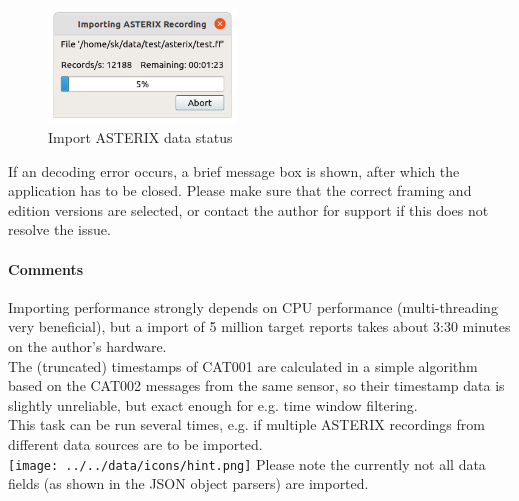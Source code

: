 \begin{figure}[H]
  \center
    \includegraphics[width=5cm]{figures/asterix_import_data_status.png}
  \caption{Import ASTERIX data status}
\end{figure}

If an decoding error occurs, a brief message box is shown, after which the application has to be closed. Please make sure that the correct framing and edition versions are selected, or contact the author for support if this does not resolve the issue. \\


\paragraph{Comments}
Importing performance strongly depends on CPU performance (multi-threading very beneficial), but a import of 5 million target reports takes about 3:30 minutes on the author's hardware. \\

The (truncated) timestamps of CAT001 are calculated in a simple algorithm based on the CAT002 messages from the same sensor, so their timestamp data is slightly unreliable, but exact enough for e.g. time window filtering. \\

This task can be run several times, e.g. if multiple ASTERIX recordings from different data sources are to be imported. \\

\texttt{[image: ../../data/icons/hint.png]} Please note the currently not all data fields (as shown in the JSON object parsers) are imported.\\


